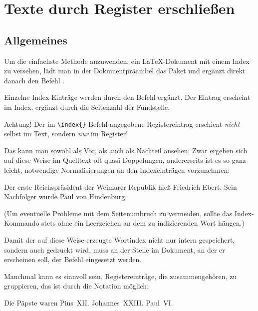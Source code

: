 \chapter{Texte durch Register erschließen}
 

\section{Allgemeines}

Um die einfachste Methode anzuwenden, ein \LaTeX{}-Dokument mit einem Index zu versehen, lädt man
in der Dokumentpräambel das Paket  und ergänzt direkt danach den Befehl 
.

Einzelne Index-Einträge werden durch den Befehl  ergänzt. 
Der Eintrag erscheint im Index, ergänzt durch die Seitenzahl der Fundstelle.

Achtung! Der im \lstinline/\index{}/-Befehl angegebene Registereintrag erschient \emph{nicht} selbst
im Text, sondern \emph{nur} im Register!

Das kann man sowohl als Vor, als auch als Nachteil ansehen:
Zwar ergeben sich auf diese Weise im Quelltext oft quasi Doppelungen, andererseits ist es so ganz 
leicht, notwendige Normalisierungen an den Indexeinträgen vorzunehmen:

\begin{lfgwcode}{}
    Der erste Reichspräsident der Weimarer Republik hieß Friedrich Ebert.
    Sein Nachfolger wurde Paul von Hindenburg.
\end{lfgwcode}

(Um eventuelle Probleme mit dem Seitenumbruch zu vermeiden, sollte das Index-Kommando stets ohne
ein Leerzeichen an dem zu indizierenden Wort hängen.)

Damit der auf diese Weise erzeugte Wortindex nicht nur intern gespeichert, sondern auch gedruckt
wird, muss an der Stelle im Dokument, an der er erscheinen soll, der Befehl 
eingesetzt werden. 


Manchmal kann es sinnvoll sein, Registereinträge, die zusammengehören, zu gruppieren,
das ist durch die Notation  möglich:
    
\begin{lfgwcode}{}
    Die Päpste waren 
    Pius~XII.
    Johannes~XXIII.
    Paul~VI.
\end{lfgwcode}    


